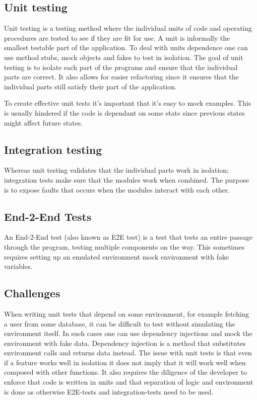 \subsection{Unit testing}

Unit testing is a testing method where the individual units of code and
operating procedures are tested to see if they are fit for use. A unit is
informally the smallest testable part of the application. To deal with units
dependence one can use method stubs, mock objects and fakes to test in
isolation. The goal of unit testing is to isolate each part of the programs and
ensure that the individual parts are correct. It also allows for easier
refactoring since it ensures that the individual parts still satisfy their part
of the application.

To create effective unit tests it's important that it's easy to mock examples.
This is usually hindered if the code is dependant on some state since previous
states might affect future states.

\subsection{Integration testing}

Whereas unit testing validates that the individual parts work in isolation;
integration tests make sure that the modules work when combined. The purpose is
to expose faults that occurs when the modules interact with each other.

\subsection{End-2-End Tests}

An End-2-End test (also known as E2E test) is a test that tests an entire
passage through the program, testing multiple components on the way. This
sometimes requires setting up an emulated environment mock environment with fake
variables.

\subsection{Challenges}\label{challenges}

When writing unit tests that depend on some environment, for example fetching a
user from some database, it can be difficult to test without simulating the
environment itself. In such cases one can use dependency injections and mock the
environment with fake data. Dependency injection is a method that substitutes
environment calls and returns data instead. The issue with unit tests is that
even if a feature works well in isolation it does not imply that it will work
well when composed with other functions. It also requires the diligence of the 
developer to enforce that code is written in units and that separation of logic and
environment is done as otherwise E2E-tests and integration-tests need to be used.

